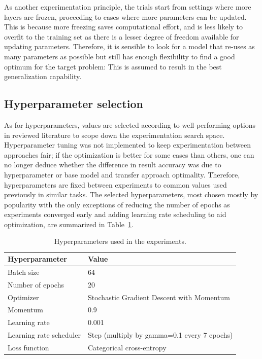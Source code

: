 \documentclass[english,twoside,openright]{UH_DS_MSc}
\begin{document}
As another experimentation principle, the trials start from settings where more layers are frozen, proceeding to
cases where more parameters can be updated. This is because more freezing saves 
computational effort, and is less likely to overfit to the training set as there is a lesser degree of freedom 
available for updating parameters. Therefore, it is sensible to look for a model that re-uses as 
many parameters as possible but still has enough flexibility to find a good optimum for the target problem:
This is assumed to result in the best generalization capability.

\subsection{Hyperparameter selection}

As for hyperparameters, values are selected according to well-performing 
options in reviewed literature to scope down the experimentation search space.
Hyperparameter tuning was not implemented to keep experimentation 
between approaches fair; if the optimization is better for some cases than others, one can no 
longer deduce whether the difference in result accuracy was due to hyperparameter or base model and 
transfer approach optimality. Therefore, hyperparameters are fixed between experiments to common values 
used previously in similar tasks. The selected hyperparameters, most chosen mostly by popularity 
with the only exceptions of reducing the number of epochs as experiments converged early
and adding learning rate scheduling to aid optimization,
are summarized in Table~\ref{table:hyperparameters}.

\begin{table}[h!]
    \centering
    \caption{Hyperparameters used in the experiments.}
    \begin{tabular}{ll}
    \hline
    \textbf{Hyperparameter} & \textbf{Value} \\ \hline
    Batch size & 64 \\ 
    Number of epochs & 20 \\
    Optimizer & Stochastic Gradient Descent with Momentum \\
    Momentum & 0.9 \\
    Learning rate & 0.001 \\
    Learning rate scheduler & Step (multiply by gamma=0.1 every 7 epochs)\\
    Loss function & Categorical cross-entropy \\ \hline
    \end{tabular}
    \label{table:hyperparameters}
\end{table}
\end{document}
